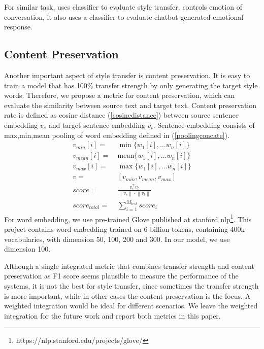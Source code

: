 \documentclass[letterpaper]{article} \usepackage{aaai18}  \usepackage{times}  \usepackage{helvet}  \usepackage{courier}  \usepackage{url}  \usepackage{graphicx}  \usepackage{amsmath}
\begin{document}
For similar task, \cite{shen2017style} uses classifier to evaluate style transfer. \cite{zhou2017emotional} controls emotion of conversation, it also uses a classifier to evaluate chatbot generated emotional response.


\subsection{Content Preservation}
Another important aspect of style transfer is content preservation. 
It is easy to train a model that has 100\% transfer strength by only generating the target style words. 
Therefore, we propose a metric for content preservation, which can evaluate the similarity between source text and target text. 
Content preservation rate is defined as cosine distance (\ref{cosinedistance}) between source sentence embedding $v_s$ 
and target sentence embedding $v_t$. 
Sentence embedding consists of max,min,mean pooling of word embedding defined in (\ref{poolingconcate}).
{\small
\begin{align}
v_{min}[i]=&~ \min\{w_1[i], \dots w_n[i]\} \\
v_{mean}[i]=&~ \text{mean}\{w_1[i], \dots w_n[i]\} \\
v_{max}[i]=&~ \max\{w_1[i], \dots w_n[i]\} \\
v =&~ [v_{min}, v_{mean}, v_{max}]                                                    \label{poolingconcate}     \\
score=&~ \frac{v_s^{\top} v_t}{\left \| v_s \right \| \cdot \left \| v_t \right \|}   \label{cosinedistance}     \\
score_{total} = &~ \sum_{i=1}^{M_{test}}score_{i}
\end{align}
}For word embedding, we use pre-trained Glove \cite{pennington2014glove} published at 
stanford nlp\footnote{https://nlp.stanford.edu/projects/glove/}. 
This project contains word embedding trained on 6 billion tokens, 
containing 400k vocabularies, with dimension 50, 100, 200 and 300. 
In our model, we use dimension 100.

Although a single integrated metric that combines transfer strength and content preservation as F1 score 
seems plausible to measure the performance of the systems, it is not the best for style transfer, since sometimes the transfer 
strength is more important, while in other cases the content preservation is the focus.
A weighted integration would be ideal for different scenarios. We leave the weighted integration for the 
future work and report both metrics in this paper.
\end{document}
